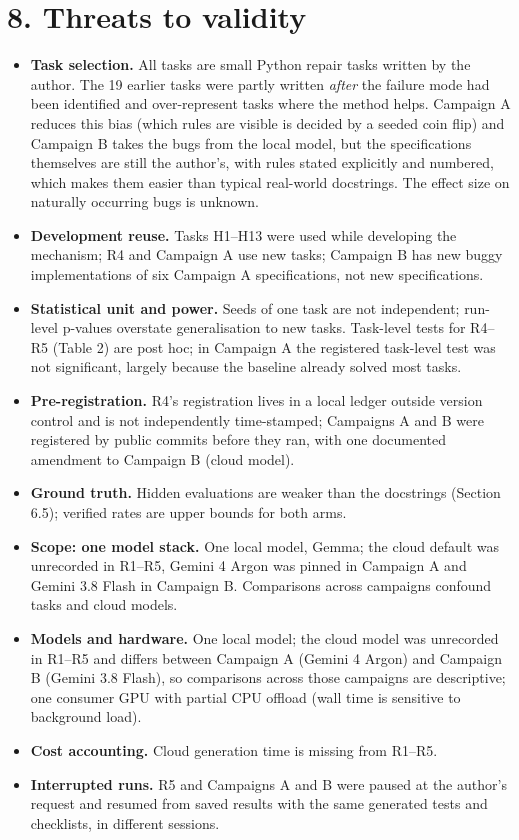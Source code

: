 \documentclass[11pt]{article}
\begin{document}
\section*{8. Threats to validity}
\begin{itemize}
\item \textbf{Task selection.} All tasks are small Python repair tasks written by the author. The 19 earlier tasks were partly written \emph{after} the failure mode had been identified and over-represent tasks where the method helps. Campaign A reduces this bias (which rules are visible is decided by a seeded coin flip) and Campaign B takes the bugs from the local model, but the specifications themselves are still the author's, with rules stated explicitly and numbered, which makes them easier than typical real-world docstrings. The effect size on naturally occurring bugs is unknown.
\item \textbf{Development reuse.} Tasks H1–H13 were used while developing the mechanism; R4 and Campaign A use new tasks; Campaign B has new buggy implementations of six Campaign A specifications, not new specifications.
\item \textbf{Statistical unit and power.} Seeds of one task are not independent; run-level p-values overstate generalisation to new tasks. Task-level tests for R4–R5 (Table 2) are post hoc; in Campaign A the registered task-level test was not significant, largely because the baseline already solved most tasks.
\item \textbf{Pre-registration.} R4's registration lives in a local ledger outside version control and is not independently time-stamped; Campaigns A and B were registered by public commits before they ran, with one documented amendment to Campaign B (cloud model).
\item \textbf{Ground truth.} Hidden evaluations are weaker than the docstrings (Section 6.5); verified rates are upper bounds for both arms.
\item \textbf{Scope: one model stack.} One local model, Gemma; the cloud default was unrecorded in R1–R5, Gemini 4 Argon was pinned in Campaign A and Gemini 3.8 Flash in Campaign B. Comparisons across campaigns confound tasks and cloud models.
\item \textbf{Models and hardware.} One local model; the cloud model was unrecorded in R1–R5 and differs between Campaign A (Gemini 4 Argon) and Campaign B (Gemini 3.8 Flash), so comparisons across those campaigns are descriptive; one consumer GPU with partial CPU offload (wall time is sensitive to background load).
\item \textbf{Cost accounting.} Cloud generation time is missing from R1–R5.
\item \textbf{Interrupted runs.} R5 and Campaigns A and B were paused at the author's request and resumed from saved results with the same generated tests and checklists, in different sessions.
\end{itemize}
\end{document}
